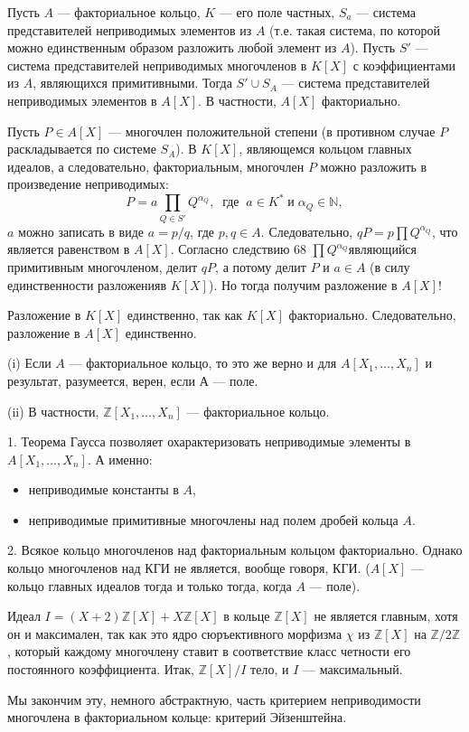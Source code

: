 \begin{thm}[Гаусса]
\hspace{0.5cm}Пусть $A$ — факториальное кольцо, $K$ — его поле частных, $S_{a}$ — система представителей неприводимых элементов из $A$ (т.е. такая си­стема, по которой можно единственным образом разложить любой эле­мент из $A$). Пусть $S'$ — система представителей неприводимых многочленов в $K[X]$ с коэффициентами из $A$, являющихся примитивными. Тогда $S'\cup S_{A}$ — система представителей неприводимых элементов в
$A[X]$. В частности, $A[X]$ факториально.
\end{thm}
\newpage
\begin{myproof}
Пусть $P\in A[X]$ — многочлен положительной степени (в противном случае $P$ раскладывается по системе $S_{A}$). В $K[X]$, являющемся кольцом главных идеалов, а следовательно, факториальным, многочлен $P$ можно разложить в произведение неприводимых:
$$P=a\prod\limits_{Q\in S'}Q^{\alpha_{Q}},\;\;\text{где}\;\;a\in K^*\;\text{и}\;\alpha_{Q}\in\mathbb{N},$$
$a$ можно записать в виде $a=p/q$, где $p,q\in A$. Следовательно, $qP=p\prod Q^{\alpha_{Q}}$, что является равенством в $A[X]$. Согласно следствию 68 $\prod Q^{\alpha_{Q}}$являющийся примитивным многочленом, делит $qP$, а потому делит $P$ и $a\in A$ (в силу единственности разложенияв $K[X]$). Но тогда получим разложение в $A[X]$!

\noindent Разложение в $K[X]$ единственно, так как $K[X]$ факториально. Следовательно, разложение в $A[X]$ единственно.
\end{myproof}
\begin{sled}
\hspace*{0.5cm}(i) Если $A$ — факториальное кольцо, то это же верно и для $A[X_{1},\ldots,X_{n}]$ и результат, разумеется, верен, если $А$ — поле.

(ii) В частности, $\mathbb{Z}[X_{1},\ldots,X_{n}]$ — факториальное кольцо.
\end{sled}
\begin{mynote}

1. Теорема Гаусса позволяет охарактеризовать неприводимые элементы в $A[X_{1},\ldots,X_{n}]$. А именно:
\begin{itemize}
\item неприводимые константы в $A$,
\item неприводимые примитивные многочлены над полем дробей кольца $A$.
\end{itemize}

2. Всякое кольцо многочленов над факториальным кольцом факториально. Однако кольцо многочленов над КГИ не является, вообще говоря, КГИ. ($A[X]$ — кольцо главных идеалов тогда и только тогда, когда $A$ — поле).

Идеал $I=(X+2)\mathbb{Z}[X]+X\mathbb{Z}[X]$ в кольце $\mathbb{Z}[X]$ не является главным, хотя он и максимален, так как это ядро сюръективного морфизма $\chi$ из $\mathbb{Z}[X]$ на $\mathbb{Z}/2\mathbb{Z}$, который каждому многочлену ставит в соответствие класс четности его постоянного коэффициента. Итак, $\mathbb{Z}[X]/I$ тело, и $I$ — максимальный.
\end{mynote}
\hspace*{15cm}

Мы закончим эту, немного абстрактную, часть критерием неприводимости многочлена в факториальном кольце: критерий Эйзенштейна.
\newpage
